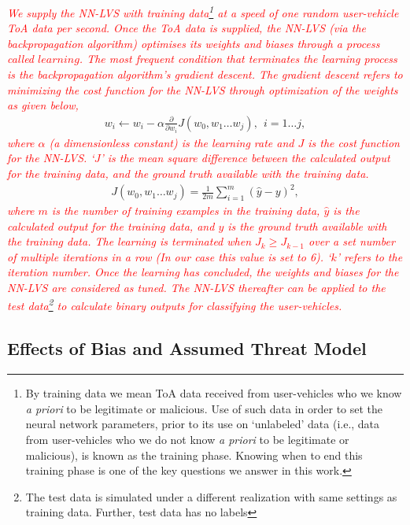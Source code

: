 \documentclass[journal]{IEEEtran}
\begin{document}
\textcolor{red}{\textit{We supply the NN-LVS with training data\footnote{By training data we mean ToA data received from user-vehicles who we know \emph{a priori} to be legitimate or malicious. Use of such data in order to set the neural network parameters, prior to its use on `unlabeled' data (i.e., data from user-vehicles who we do not know \emph{a priori } to be legitimate or malicious), is known as the training phase. Knowing when to end this training phase is one of the key questions we answer in this work.} at a speed of one random user-vehicle ToA data per second. Once the ToA data is supplied, the NN-LVS (via the backpropagation algorithm) optimises its weights and biases through a process called $learning$. The most frequent condition that terminates the learning process is the backpropagation algorithm's gradient descent. The gradient descent refers to minimizing the cost function for the  NN-LVS through optimization of the weights as given below,}}
\begin{eqnarray*}
    w_i \leftarrow w_i-\alpha \frac{\partial}{\partial w_i}J(w_0,w_1\dots w_j),~~ i=1 \dots j,
\end{eqnarray*}
\textcolor{red}{\textit{where $\alpha$ (a dimensionless constant) is the learning rate and $J$ is the cost function for the NN-LVS. `$J$' is the mean square difference between the calculated output for the training data, and the ground truth available with the training data.}}
\begin{eqnarray*}
   J(w_0,w_1\dots w_j) = \frac{1}{2m}\sum_{i=1}^{m} (\hat{y} - y)^2,
\end{eqnarray*}
\textcolor{red}{\textit{where $m$ is the number of training examples in the training data, $\hat{y}$ is the calculated output for the training data, and $y$ is the ground truth available with the training data. The learning is terminated when $J_k \geq J_{k-1}$ over a set number of multiple iterations in a row (In our case this value is set to 6). `$k$' refers to the iteration number. Once the learning has concluded, the weights and biases for the NN-LVS are considered as tuned. The NN-LVS thereafter can be applied to the test data\footnote{The test data is simulated under a different realization with same settings as training data. Further, test data has no labels} to calculate binary outputs for classifying the user-vehicles.}}

\subsection{Effects of Bias and Assumed Threat Model}
\end{document}
